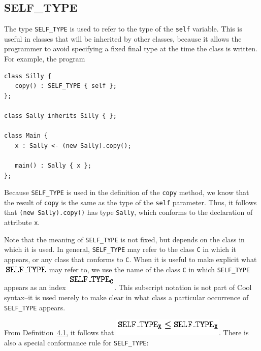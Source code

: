 \documentclass[]{article}
\begin{document}
\subsection{SELF\_TYPE}

The type \texttt{SELF\_TYPE} is used to refer to the type of the
\texttt{self} variable. This is useful in classes that will be inherited
by other classes, because it allows the programmer to avoid specifying a
fixed final type at the time the class is written. For example, the
program

\begin{verbatim}
class Silly {
   copy() : SELF_TYPE { self };
};

class Sally inherits Silly { };

class Main {
   x : Sally <- (new Sally).copy();

   main() : Sally { x };
};
\end{verbatim}

Because \texttt{SELF\_TYPE} is used in the definition of the
\texttt{copy} method, we know that the result of \texttt{copy} is the
same as the type of the \texttt{self} parameter. Thus, it follows that
\texttt{(new Sally).copy()} has type \texttt{Sally}, which conforms to
the declaration of attribute \texttt{x}.

Note that the meaning of \texttt{SELF\_TYPE} is not fixed, but depends
on the class in which it is used. In general, \texttt{SELF\_TYPE} may
refer to the class \texttt{C} in which it appears, or any class that
conforms to \texttt{C}. When it is useful to make explicit what
\includegraphics{img9.png} may refer to, we use the name of the class
\texttt{C} in which \texttt{SELF\_TYPE} appears as an index
\includegraphics{img10.png}. This subscript notation is not part of Cool
syntax--it is used merely to make clear in what class a particular
occurrence of \texttt{SELF\_TYPE} appears.

From Definition~\href{node7.html\#def-conforms}{4.1}, it follows that
\includegraphics{img11.png}. There is also a special conformance rule
for \texttt{SELF\_TYPE}: \\
\end{document}
